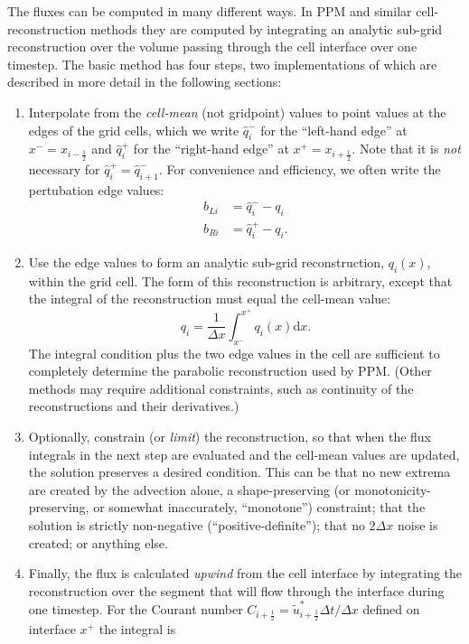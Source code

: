 \documentclass[10pt,letterpaper,margin=1in]{memoir}
\newcommand{\half}{\frac{1}{2}}
\begin{document}
The fluxes can be computed in many different ways. In PPM and similar cell-reconstruction methods they are computed by integrating an analytic sub-grid reconstruction over the volume passing through the cell interface over one timestep. The basic method has four steps, two implementations of which are described in more detail in the following sections:
\begin{enumerate} 
\item Interpolate from the \textit{cell-mean} (not gridpoint) values to point values at the edges of the grid cells, which we write $\widehat{q}_{i}^{ -}$ for the ``left-hand edge'' at $x^- = x_{i-\half}$ and $\widehat{q}_{i}^+$ for the ``right-hand edge'' at $x^+ = x_{i+\half}$. Note that it is \textit{not} necessary for $\widehat{q}_{i}^+ = \widehat{q}_{i+1}^-$. For convenience and efficiency, we often write the pertubation edge values:
\begin{equation}
\begin{split}
b_{Li} & = \widehat{q}_{i}^- - q_i \\
b_{Ri} & = \widehat{q}_{i}^+ - q_i.
\end{split}
\end{equation}
\item Use the edge values to form an analytic sub-grid reconstruction, $q_i(x)$, within the grid cell. The form of this reconstruction is arbitrary, except that the integral of the reconstruction must equal the cell-mean value: 
\begin{equation} \label{eqn:reconNormal}
q_i = \frac{1}{\Delta x} \int_{x^-}^{x^+} q_i(x) \mathrm{d}x. 
\end{equation}
The integral condition plus the two edge values in the cell are sufficient to completely determine the parabolic reconstruction used by PPM. (Other methods may require additional constraints, such as continuity of the reconstructions and their derivatives.)
\item Optionally, constrain (or \textit{limit}) the reconstruction, so that when the flux integrals in the next step are evaluated and the cell-mean values are updated, the solution preserves a desired condition. This can be that no new extrema are created by the advection alone, a shape-preserving (or monotonicity-preserving, or somewhat inaccurately, ``monotone'') constraint; that the solution is strictly non-negative (``positive-definite''); that no $2\Delta x$ noise is created; or anything else. 
\item Finally, the flux is calculated \textit{upwind} from the cell interface by integrating the reconstruction over the segment that will flow through the interface during one timestep. For the Courant number $C_{i+\half} = \widetilde{u}_{i+\half}^* \Delta t/\Delta x$ defined on interface $x^+$ the integral is 

\end{enumerate}
\end{document}
